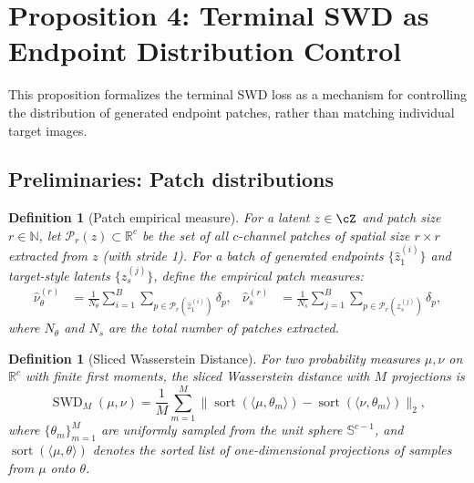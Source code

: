 \documentclass[letterpaper]{article}
\newtheorem{definition}[proposition]{Definition}
\newcommand{\R}{\mathbb{R}}
\newcommand{\SWD}{\operatorname{SWD}}
\newcommand{\sort}{\operatorname{sort}}
\begin{document}
\section{Proposition 4: Terminal SWD as Endpoint Distribution Control}

This proposition formalizes the terminal SWD loss as a mechanism for
controlling the distribution of generated endpoint patches, rather than
matching individual target images.

\subsection{Preliminaries: Patch distributions}

\begin{definition}[Patch empirical measure]
For a latent $z \in \cZ$ and patch size $r \in \mathbb{N}$, let
$\mathcal{P}_r(z) \subset \R^c$ be the set of all $c$-channel patches
of spatial size $r \times r$ extracted from $z$ (with stride 1).
For a batch of generated endpoints $\{\hat z_1^{(i)}\}$ and target-style
latents $\{z_s^{(j)}\}$, define the empirical patch measures:
\begin{align}
    \hat\nu_\theta^{(r)} &= \frac{1}{N_\theta} \sum_{i=1}^B \sum_{p \in \mathcal{P}_r(\hat z_1^{(i)})} \delta_p,
    &
    \hat\nu_s^{(r)} &= \frac{1}{N_s} \sum_{j=1}^B \sum_{p \in \mathcal{P}_r(z_s^{(j)})} \delta_p,
\end{align}
where $N_\theta$ and $N_s$ are the total number of patches extracted.
\end{definition}

\begin{definition}[Sliced Wasserstein Distance]
\label{def:swd}
For two probability measures $\mu, \nu$ on $\R^c$ with finite first moments,
the sliced Wasserstein distance with $M$ projections is
\begin{equation}
    \SWD_M(\mu, \nu) = \frac{1}{M} \sum_{m=1}^M
        \bigl\| \sort(\langle \mu, \theta_m\rangle) - \sort(\langle \nu, \theta_m\rangle) \bigr\|_2,
    \label{eq:swd_definition}
\end{equation}
where $\{\theta_m\}_{m=1}^M$ are uniformly sampled from the unit sphere
$\mathbb{S}^{c-1}$, and $\sort(\langle \mu, \theta\rangle)$ denotes the
sorted list of one-dimensional projections of samples from $\mu$ onto
$\theta$.
\end{definition}
\end{document}
